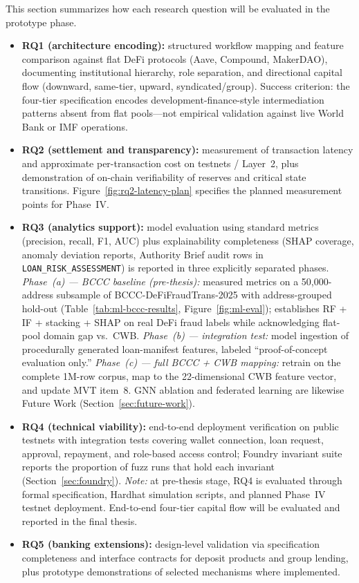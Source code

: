 \documentclass[12pt,a4paper]{report}
\begin{document}
This section summarizes how each research question will be evaluated in the prototype phase.
\begin{itemize}[noitemsep]
\item \textbf{RQ1 (architecture encoding):} structured workflow mapping and feature comparison against flat DeFi protocols (Aave, Compound, MakerDAO), documenting institutional hierarchy, role separation, and directional capital flow (downward, same-tier, upward, syndicated/group). Success criterion: the four-tier specification encodes development-finance-style intermediation patterns absent from flat pools---not empirical validation against live World Bank or IMF operations.
\item \textbf{RQ2 (settlement and transparency):} measurement of transaction latency and approximate per-transaction cost on testnets / Layer~2, plus demonstration of on-chain verifiability of reserves and critical state transitions. Figure~\ref{fig:rq2-latency-plan} specifies the planned measurement points for Phase~IV.
\item \textbf{RQ3 (analytics support):} model evaluation using standard metrics (precision, recall, F1, AUC) plus explainability completeness (SHAP coverage, anomaly deviation reports, Authority Brief audit rows in \texttt{LOAN\_RISK\_ASSESSMENT}) is reported in three explicitly separated phases. \textit{Phase~(a) --- BCCC baseline (pre-thesis):} measured metrics on a 50{,}000-address subsample of BCCC-DeFiFraudTrans-2025 with address-grouped hold-out (Table~\ref{tab:ml-bccc-results}, Figure~\ref{fig:ml-eval}); establishes RF + IF + stacking + SHAP on real DeFi fraud labels while acknowledging flat-pool domain gap vs.\ CWB. \textit{Phase~(b) --- integration test:} model ingestion of procedurally generated loan-manifest features, labeled ``proof-of-concept evaluation only.'' \textit{Phase~(c) --- full BCCC + CWB mapping:} retrain on the complete 1M-row corpus, map to the 22-dimensional CWB feature vector, and update MVT item~8. GNN ablation and federated learning are likewise Future Work (Section~\ref{sec:future-work}).
\item \textbf{RQ4 (technical viability):} end-to-end deployment verification on public testnets with integration tests covering wallet connection, loan request, approval, repayment, and role-based access control; Foundry invariant suite reports the proportion of fuzz runs that hold each invariant (Section~\ref{sec:foundry}). \textit{Note:} at pre-thesis stage, RQ4 is evaluated through formal specification, Hardhat simulation scripts, and planned Phase~IV testnet deployment. End-to-end four-tier capital flow will be evaluated and reported in the final thesis.
\item \textbf{RQ5 (banking extensions):} design-level validation via specification completeness and interface contracts for deposit products and group lending, plus prototype demonstrations of selected mechanisms where implemented.
\end{itemize}
\end{document}
